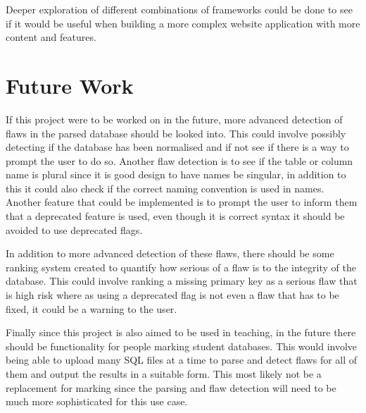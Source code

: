 Deeper exploration of different combinations of frameworks could be done to see if it would be useful when building a more complex website application with more content and features. 


\section{Future Work}

If this project were to be worked on in the future, more advanced detection of flaws in the parsed database should be looked into. This could involve possibly detecting if the database has been normalised and if not see if there is a way to prompt the user to do so. Another flaw detection is to see if the table or column name is plural since it is good design to have names be singular, in addition to this it could also check if the correct naming convention is used in names. Another feature that could be implemented is to prompt the user to inform them that a deprecated feature is used, even though it is correct syntax it should be avoided to use deprecated flags.

In addition to more advanced detection of these flaws, there should be some ranking system created to quantify how serious of a flaw is to the integrity of the database. This could involve ranking a missing primary key as a serious flaw that is high risk where as using a deprecated flag is not even a flaw that has to be fixed, it could be a warning to the user.

Finally since this project is also aimed to be used in teaching, in the future there should be functionality for people marking student databases. This would involve being able to upload many SQL files at a time to parse and detect flaws for all of them and output the results in a suitable form. This most likely not be a replacement for marking since the parsing and flaw detection will need to be much more sophisticated for this use case.